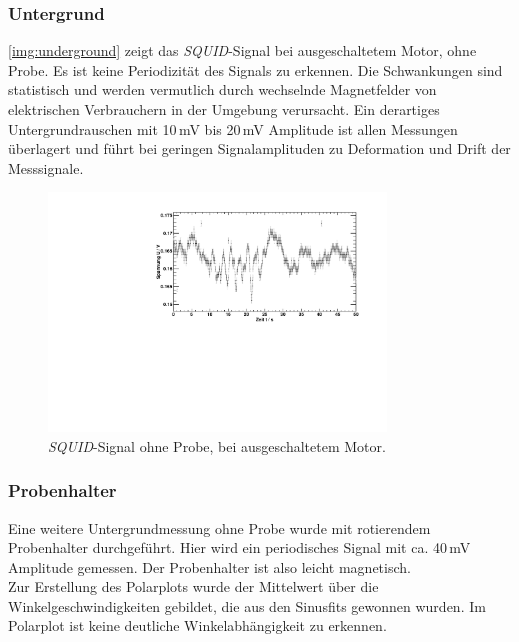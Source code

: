 \subsubsection{Untergrund}
\autoref{img:underground} zeigt das \emph{SQUID}-Signal bei ausgeschaltetem Motor, ohne Probe.
Es ist keine Periodizität des Signals zu erkennen. Die Schwankungen sind statistisch
und werden vermutlich durch wechselnde Magnetfelder von elektrischen Verbrauchern in der Umgebung verursacht.
Ein derartiges Untergrundrauschen mit 10\,mV bis 20\,mV Amplitude
ist allen Messungen überlagert und führt bei geringen Signalamplituden zu
Deformation und Drift der Messsignale.

\begin{figure}[H]
\begin{center}
  \includegraphics[width=0.8\textwidth]{../img/Untergrund.pdf}
  \caption{\emph{SQUID}-Signal ohne Probe, bei ausgeschaltetem Motor.}
  \label{img:underground}
\end{center}
\end{figure}

\subsubsection{Probenhalter}
Eine weitere Untergrundmessung ohne Probe wurde mit rotierendem Proben\-hal\-ter durch\-ge\-führt.
Hier wird ein periodisches Signal mit ca. 40\,mV Amplitude gemessen.
Der Probenhalter ist also leicht magnetisch.\\
Zur Erstellung des Polarplots wurde der Mittelwert über die Winkelgeschwindigkeiten gebildet,
die aus den Sinusfits gewonnen wurden.
Im Polarplot ist keine deutliche Winkelabhängigkeit zu erkennen.

